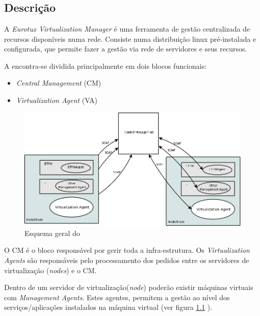 \chapter{\textsf{\acronym}}
\section*{Descrição}
A \emph{Eurotux Virtualization Manager} é uma ferramenta de gestão centralizada de recursos disponíveis numa rede. Consiste numa distribuição linux pré-instalada e configurada, que permite fazer a gestão via rede de servidores e seus recursos.

A \acronym encontra-se dividida principalmente em dois blocos funcionais:

\begin{itemize}
	\item \emph{Central Management} (CM)
        \item \emph{Virtualization Agent} (VA)
\end{itemize}

\begin{figure}[H]
	\begin{center}
	\includegraphics[scale=0.35]{screenshots/etva_blocos.png}
	\caption{Esquema geral do \acronym}
	\label{fig:etva_blocos}
	\end{center}
\end{figure}

O CM é o bloco responsável por gerir toda a infra-estrutura.
Os \emph{Virtualization Agents} são responsáveis pelo processamento dos pedidos entre os servidores de virtualização (\emph{nodes}) e o CM.

Dentro de um servidor de virtualização(\emph{node}) poderão existir máquinas virtuais com \emph{Management Agents}. Estes agentes, permitem a gestão ao nível dos serviços/aplicações instalados na máquina virtual (ver figura \ref{fig:etva_blocos} ).

